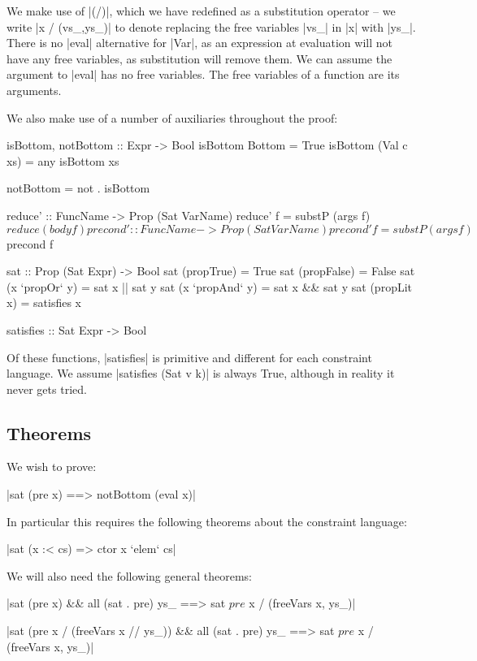 We make use of |(/)|, which we have redefined as a substitution operator -- we write |x / (vs_,ys_)| to denote replacing the free variables |vs_| in |x| with |ys_|. There is no |eval| alternative for |Var|, as an expression at evaluation will not have any free variables, as substitution will remove them. We can assume the argument to |eval| has no free variables. The free variables of a function are its arguments.

We also make use of a number of auxiliaries throughout the proof:

\begin{code}
isBottom, notBottom :: Expr -> Bool
isBottom Bottom = True
isBottom (Val c xs) = any isBottom xs

notBottom = not . isBottom

reduce' :: FuncName -> Prop (Sat VarName)
reduce' f = substP (args f) $ reduce (body f)

precond' :: FuncName -> Prop (Sat VarName)
precond' f = substP (args f) $ precond f

sat :: Prop (Sat Expr) -> Bool
sat (propTrue) = True
sat (propFalse) = False
sat (x `propOr` y) = sat x || sat y
sat (x `propAnd` y) = sat x && sat y
sat (propLit x) = satisfies x

satisfies :: Sat Expr -> Bool
\end{code}

Of these functions, |satisfies| is primitive and different for each constraint language. We assume |satisfies (Sat v k)| is always True, although in reality it never gets tried.

\subsection{Theorems}

We wish to prove:

{|sat (pre x) ==> notBottom (eval x)|}

In particular this requires the following theorems about the constraint language:

{|sat (x :< cs) => ctor x `elem` cs|}


We will also need the following general theorems:

{|sat (pre x) && all (sat . pre) ys_ ==> sat $ pre $ x / (freeVars x, ys_)|}

{|sat (pre x / (freeVars x // ys_)) && all (sat . pre) ys_ ==> sat $ pre $ x / (freeVars x, ys_)|}

